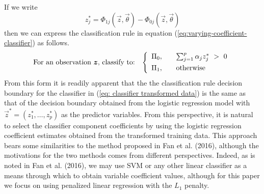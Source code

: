 If we write
\begin{equation}
  z_j^{*} = \Phi_{1j}(\vec{z}, \vec{\theta}) - \Phi_{0j}(\vec{z}, \vec{\theta})
\end{equation}
then we can express the classification rule in equation
(\ref{eq:varying-coefficient-classifier}) as follows.
\begin{equation}
  \label{eq: classifier transformed data}
  \text{For an observation $\vec{z}$, classify to:} \hspace{3mm} \left\{ 
    \begin{array}{lcl}
      \Pi_0, & & \sum_{j = 1}^p \alpha_j z_j^{*} ~>~ 0 \\[1ex]
      \Pi_1, & & \text{otherwise} \\[0ex]
    \end{array}
  \right.
\end{equation}
From this form it is readily apparent that the the classification rule decision
boundary for the classifier in (\ref{eq: classifier transformed data}) is the
same as that of the decision boundary obtained from the logistic regression
model with $\vec{z}^{*} = (z_1^{*}, \dots, z_p^{*})$ as the predictor variables.
From this perspective, it is natural to select the classifier component
coefficients by using the logistic regression coefficient estimates obtained
from the transformed training data.  This approach bears some similarities to
the method proposed in Fan et al. (2016), although the motivations for the two
methods comes from different perspectives.  Indeed, as is noted in Fan et
al. (2016), we may use SVM or any other linear classifier as a means through
which to obtain variable coefficient values, although for this paper we focus on
using penalized linear regression with the $L_1$ penalty.




  
  

